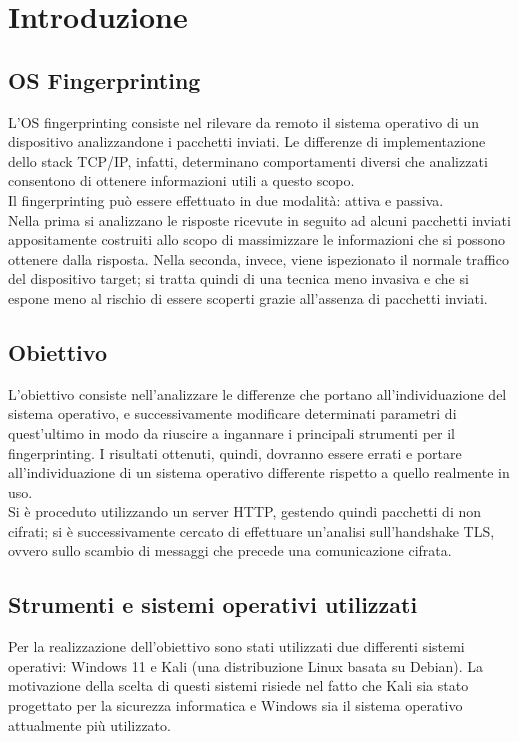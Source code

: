 

\chapter{Introduzione}
\label{introduzione}

\section{OS Fingerprinting}
\label{citazioni}

L'OS fingerprinting consiste nel rilevare da remoto il sistema operativo di un dispositivo analizzandone i pacchetti inviati. Le differenze di implementazione dello stack TCP/IP, infatti, determinano comportamenti diversi che analizzati consentono di ottenere informazioni utili a questo scopo. \\
Il fingerprinting può essere effettuato in due modalità: attiva e passiva. \\ 
Nella prima si analizzano le risposte ricevute in seguito ad alcuni pacchetti inviati appositamente costruiti allo scopo di massimizzare le informazioni che si possono ottenere dalla risposta.
Nella seconda, invece, viene ispezionato il normale traffico del dispositivo target; si tratta quindi di una tecnica meno invasiva e che si espone meno al rischio di essere scoperti grazie all'assenza di pacchetti inviati.

\section{Obiettivo}
L'obiettivo consiste nell'analizzare le differenze che portano all'individuazione del sistema operativo, e successivamente modificare determinati parametri di quest'ultimo in modo da riuscire a ingannare i principali strumenti per il fingerprinting.
I risultati ottenuti, quindi, dovranno essere errati e portare all'individuazione di un sistema operativo differente rispetto a quello realmente in uso.\\
Si è proceduto utilizzando un server HTTP, gestendo quindi pacchetti di non cifrati; si è successivamente cercato di effettuare un'analisi sull'handshake TLS, ovvero sullo scambio di messaggi che precede una comunicazione cifrata.

\section{Strumenti e sistemi operativi utilizzati}
Per la realizzazione dell'obiettivo sono stati utilizzati due differenti sistemi operativi: Windows 11 e Kali (una distribuzione Linux basata su Debian).
La motivazione della scelta di questi sistemi risiede nel fatto che Kali sia stato progettato per la sicurezza informatica e Windows sia il sistema operativo attualmente più utilizzato.

